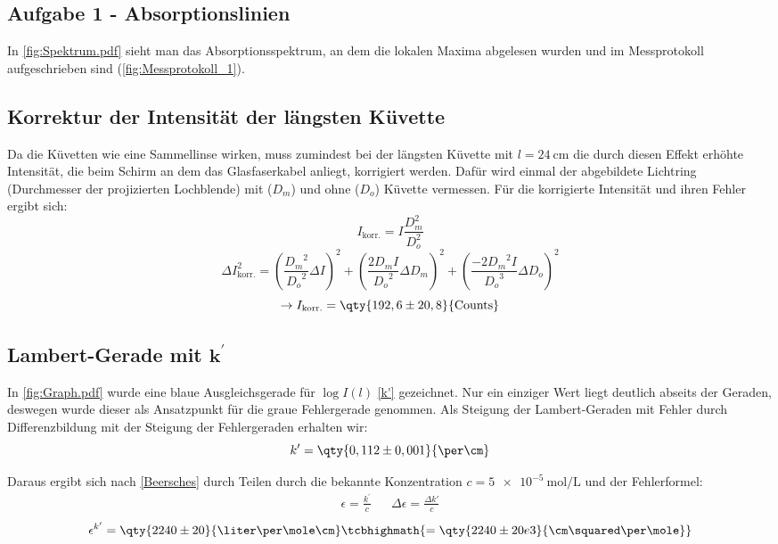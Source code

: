 \subsection{Aufgabe 1 - Absorptionslinien}
In \cref{fig:Spektrum.pdf} sieht man das Absorptionsspektrum, an dem die lokalen Maxima abgelesen wurden und im Messprotokoll aufgeschrieben sind (\cref{fig:Messprotokoll_1}).


\subsection{Korrektur der Intensität der längsten Küvette}
Da die Küvetten wie eine Sammellinse wirken, muss zumindest bei der längsten Küvette mit \(l=\qty{24}{\cm}\) die durch diesen Effekt erhöhte Intensität, die beim Schirm an dem das Glasfaserkabel anliegt, korrigiert werden. Dafür wird einmal der abgebildete Lichtring (Durchmesser der projizierten Lochblende) mit (\(D_m\)) und ohne (\(D_o\)) Küvette vermessen. Für die korrigierte Intensität und ihren Fehler ergibt sich:
\begin{equation}
  I_{\text{korr.}}=I\frac{D_m^{2}}{D_o^{2}}
\end{equation}
\begin{equation}
  \Delta I_{\text{korr.}}^{2}=\left(\frac{{D_m}^2}{{D_o}^2} \Delta I\right)^2+\left(\frac{2D_m I}{{D_o}^2} \Delta D_m\right)^2+\left(\frac{-2{D_m}^2 I}{{D_o}^3} \Delta D_o\right)^2
\end{equation}
\[\rightarrow I_{\text{korr.}}=\qty{192,6 \pm 20,8}{\text{Counts}}\]

\subsection[\texorpdfstring{Lambert-Gerade mit \(k^\prime\)}{Lambert Gerade mit k'}]{Lambert-Gerade mit \(\boldsymbol{k^\prime}\)}
In \cref{fig:Graph.pdf} wurde eine blaue Ausgleichsgerade für \(\log{I}(l)\) \cref{k'} gezeichnet. Nur ein einziger Wert liegt deutlich abseits der Geraden, deswegen wurde dieser als Ansatzpunkt für die graue Fehlergerade genommen. Als Steigung der Lambert-Geraden mit Fehler durch Differenzbildung mit der Steigung der Fehlergeraden erhalten wir:
\[k'=\qty{0,112 \pm 0,001}{\per\cm}\]

Daraus ergibt sich nach \cref{Beersches} durch Teilen durch die bekannte Konzentration \(c=\qty{5e-5}{\mole\per\liter}\) und der Fehlerformel:
\begin{align}
  \epsilon=\frac{k^\prime}{c} && \Delta \epsilon = \frac{\Delta k'}{c}
\end{align}
\[\epsilon^{k^\prime} = \qty{2240 \pm 20}{\liter\per\mole\cm} \tcbhighmath{= \qty{2240 \pm 20 e3}{\cm\squared\per\mole}}\]

